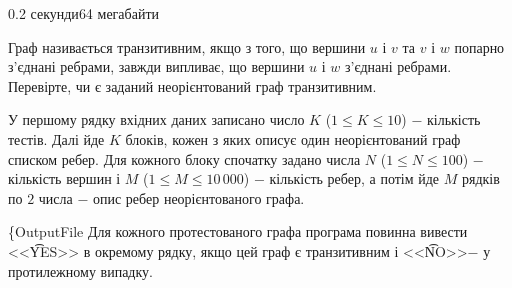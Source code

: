 \begin{problem}{}{}{}{0.2 секунди}{64 мегабайти}

Граф називається транзитивним, якщо з того, що вершини $u$ і $v$ та $v$ і $w$ попарно з'єднані ребрами, завжди випливає, що вершини $u$ і $w$ з'єднані ребрами.
Перевірте, чи є заданий неорієнтований граф транзитивним.

\InputFile
У першому рядку вхідних даних записано число $K$ ($1 \le K \le 10$) $-$ кількість тестів. 
Далі йде $K$ блоків, кожен з яких описує один неорієнтований граф списком ребер. 
Для кожного блоку спочатку задано числа $N$ ($1 \le N \le 100$) $-$ кількість вершин і $M$ ($1 \le M \le 10\,000$) $-$ кількість ребер,
а потім йде $M$ рядків по $2$ числа $-$ опис ребер неорієнтованого графа.

\{OutputFile
Для кожного протестованого графа програма повинна вивести <<{\t{YES}}>> в окремому рядку, якщо цей граф є транзитивним і <<{\t{NO}}>>$-$ у протилежному випадку.

\Example

\begin{example}
%
\end{example}

\end{problem}
